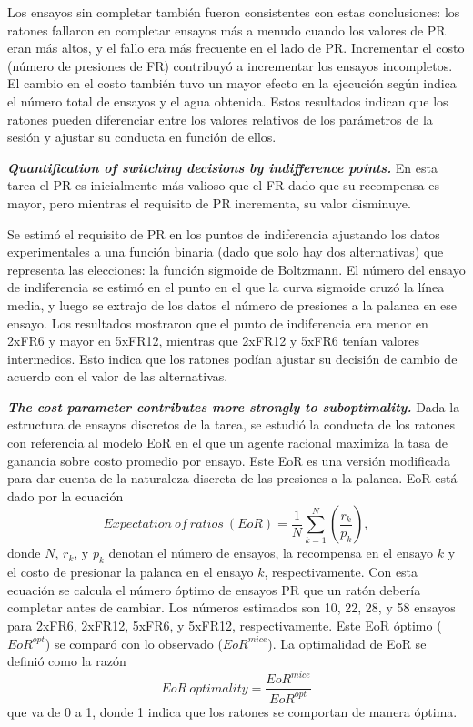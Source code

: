 \documentclass[a4paper,12pt]{article}
\begin{document}
Los ensayos sin completar también fueron consistentes con estas conclusiones: los ratones fallaron en completar ensayos más a menudo cuando los valores de PR eran más altos, y el fallo era más frecuente en el lado de PR. Incrementar el costo (número de presiones de FR) contribuyó a incrementar los ensayos incompletos. El cambio en el costo también tuvo un mayor efecto en la ejecución según indica el número total de ensayos y el agua obtenida. Estos resultados indican que los ratones pueden diferenciar entre los valores relativos de los parámetros de la sesión y ajustar su conducta en función de ellos.

{\itshape\bfseries Quantification of switching decisions by indifference points.} En esta tarea el PR es inicialmente más valioso que el FR dado que su recompensa es mayor, pero mientras el requisito de PR incrementa, su valor disminuye. 

Se estimó el requisito de PR en los puntos de indiferencia ajustando los datos experimentales a una función binaria (dado que solo hay dos alternativas) que representa las elecciones: la función sigmoide de Boltzmann. El número del ensayo de indiferencia se estimó en el punto en el que la curva sigmoide cruzó la línea media, y luego se extrajo de los datos el número de presiones a la palanca en ese ensayo. Los resultados mostraron que el punto de indiferencia era menor en 2xFR6 y mayor en 5xFR12, mientras que 2xFR12 y 5xFR6 tenían valores intermedios. Esto indica que los ratones podían ajustar su decisión de cambio de acuerdo con el valor de las alternativas.

{\itshape\bfseries The cost parameter contributes more strongly to suboptimality.} Dada la estructura de ensayos discretos de la tarea, se estudió la conducta de los ratones con referencia al modelo EoR en el que un agente racional maximiza la tasa de ganancia sobre costo promedio por ensayo. Este EoR es una versión modificada para dar cuenta de la naturaleza discreta de las presiones a la palanca. EoR está dado por la ecuación
\begin{equation}
	Expectation\ of\ ratios\ (EoR)
	=
	\frac{1}{N}
	\sum_{k=1}^N
	\left(
		\frac{r_k}{p_k}
	\right),
\end{equation}
donde $N$, $r_k$, y $p_k$ denotan el número de ensayos, la recompensa en el ensayo $k$ y el costo de presionar la palanca en el ensayo $k$, respectivamente. Con esta ecuación se calcula el número óptimo de ensayos PR que un ratón debería completar antes de cambiar. Los números estimados son 10, 22, 28, y 58 ensayos para 2xFR6, 2xFR12, 5xFR6, y 5xFR12, respectivamente. Este EoR óptimo ($EoR^{opt}$) se comparó con lo observado ($EoR^{mice}$). La optimalidad de EoR se definió como la razón
\begin{equation}
	EoR\ optimality
	=
	\frac{
		EoR^{mice}
	}{
	EoR^{opt}
	}
\end{equation}
que va de 0 a 1, donde 1 indica que los ratones se comportan de manera óptima.
\end{document}
